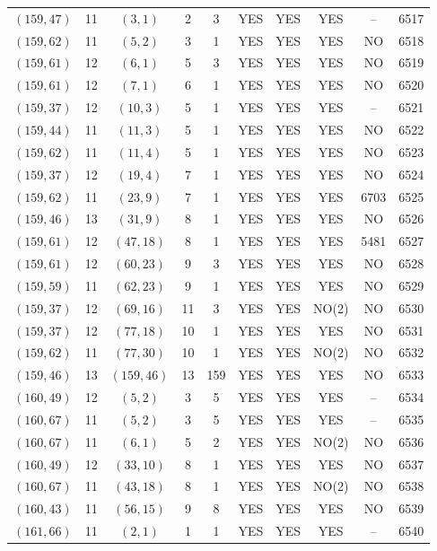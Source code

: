 \begin{longtable}{|c|c|c|c|c|c|c|c|c|c|}
$(159, 47)$ & 11 & $(3, 1)$ & 2 & 3 & YES & YES & YES & -- & 6517\\
$(159, 62)$ & 11 & $(5, 2)$ & 3 & 1 & YES & YES & YES & NO & 6518\\
$(159, 61)$ & 12 & $(6, 1)$ & 5 & 3 & YES & YES & YES & NO & 6519\\
$(159, 61)$ & 12 & $(7, 1)$ & 6 & 1 & YES & YES & YES & NO & 6520\\
$(159, 37)$ & 12 & $(10, 3)$ & 5 & 1 & YES & YES & YES & -- & 6521\\
$(159, 44)$ & 11 & $(11, 3)$ & 5 & 1 & YES & YES & YES & NO & 6522\\
$(159, 62)$ & 11 & $(11, 4)$ & 5 & 1 & YES & YES & YES & NO & 6523\\
$(159, 37)$ & 12 & $(19, 4)$ & 7 & 1 & YES & YES & YES & NO & 6524\\
$(159, 62)$ & 11 & $(23, 9)$ & 7 & 1 & YES & YES & YES & 6703 & 6525\\
$(159, 46)$ & 13 & $(31, 9)$ & 8 & 1 & YES & YES & YES & NO & 6526\\
$(159, 61)$ & 12 & $(47, 18)$ & 8 & 1 & YES & YES & YES & 5481 & 6527\\
$(159, 61)$ & 12 & $(60, 23)$ & 9 & 3 & YES & YES & YES & NO & 6528\\
$(159, 59)$ & 11 & $(62, 23)$ & 9 & 1 & YES & YES & YES & NO & 6529\\
$(159, 37)$ & 12 & $(69, 16)$ & 11 & 3 & YES & YES & NO(2) & NO & 6530\\
$(159, 37)$ & 12 & $(77, 18)$ & 10 & 1 & YES & YES & YES & NO & 6531\\
$(159, 62)$ & 11 & $(77, 30)$ & 10 & 1 & YES & YES & NO(2) & NO & 6532\\
$(159, 46)$ & 13 & $(159, 46)$ & 13 & 159 & YES & YES & YES & NO & 6533\\
$(160, 49)$ & 12 & $(5, 2)$ & 3 & 5 & YES & YES & YES & -- & 6534\\
$(160, 67)$ & 11 & $(5, 2)$ & 3 & 5 & YES & YES & YES & -- & 6535\\
$(160, 67)$ & 11 & $(6, 1)$ & 5 & 2 & YES & YES & NO(2) & NO & 6536\\
$(160, 49)$ & 12 & $(33, 10)$ & 8 & 1 & YES & YES & YES & NO & 6537\\
$(160, 67)$ & 11 & $(43, 18)$ & 8 & 1 & YES & YES & NO(2) & NO & 6538\\
$(160, 43)$ & 11 & $(56, 15)$ & 9 & 8 & YES & YES & YES & NO & 6539\\
$(161, 66)$ & 11 & $(2, 1)$ & 1 & 1 & YES & YES & YES & -- & 6540\\

\end{longtable}
